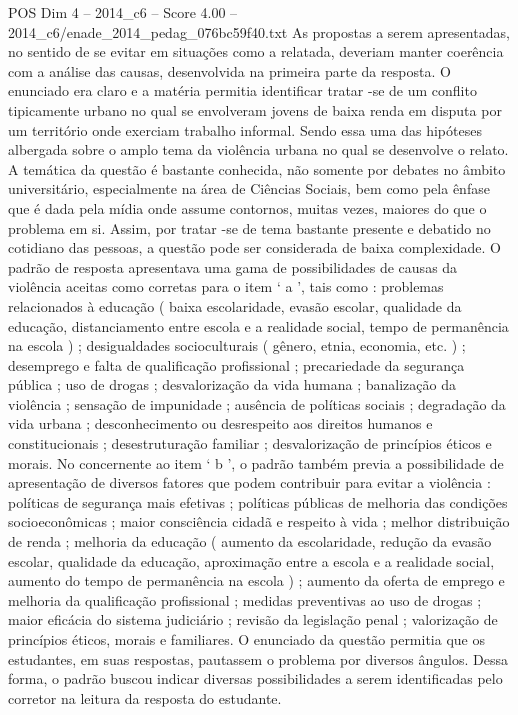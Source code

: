 \begin{textsample}{POS Dim 4 – 2014\_c6 – Score 4.00 – 2014\_c6/enade\_2014\_pedag\_076bc59f40.txt}
As propostas a serem apresentadas, no sentido de se evitar em situações como a relatada, deveriam manter coerência com a análise das causas, desenvolvida na primeira parte da resposta.
O enunciado era claro e a matéria permitia identificar tratar -se de um conflito tipicamente urbano no qual se envolveram jovens de baixa renda em disputa por um território onde exerciam trabalho informal.
Sendo essa uma das hipóteses albergada sobre o amplo tema da violência urbana no qual se desenvolve o relato.
A temática da questão é bastante conhecida, não somente por debates no âmbito universitário, especialmente na área de Ciências Sociais, bem como pela ênfase que é dada pela mídia onde assume contornos, muitas vezes, maiores do que o problema em si.
Assim, por tratar -se de tema bastante presente e debatido no cotidiano das pessoas, a questão pode ser considerada de baixa complexidade.
O padrão de resposta apresentava uma gama de possibilidades de causas da violência aceitas como corretas para o item ‘ a ’, tais como : problemas relacionados à educação ( baixa escolaridade, evasão escolar, qualidade da educação, distanciamento entre escola e a realidade social, tempo de permanência na escola ) ; desigualdades socioculturais ( gênero, etnia, economia, etc. ) ; desemprego e falta de qualificação profissional ; precariedade da segurança pública ; uso de drogas ; desvalorização da vida humana ; banalização da violência ; sensação de impunidade ; ausência de políticas sociais ; degradação da vida urbana ; desconhecimento ou desrespeito aos direitos humanos e constitucionais ; desestruturação familiar ; desvalorização de princípios éticos e morais.
No concernente ao item ‘ b ’, o padrão também previa a possibilidade de apresentação de diversos fatores que podem contribuir para evitar a violência : políticas de segurança mais efetivas ; políticas públicas de melhoria das condições socioeconômicas ; maior consciência cidadã e respeito à vida ; melhor distribuição de renda ; melhoria da educação ( aumento da escolaridade, redução da evasão escolar, qualidade da educação, aproximação entre a escola e a realidade social, aumento do tempo de permanência na escola ) ; aumento da oferta de emprego e melhoria da qualificação profissional ; medidas preventivas ao uso de drogas ; maior eficácia do sistema judiciário ; revisão da legislação penal ; valorização de princípios éticos, morais e familiares.
O enunciado da questão permitia que os estudantes, em suas respostas, pautassem o problema por diversos ângulos.
Dessa forma, o padrão buscou indicar diversas possibilidades a serem identificadas pelo corretor na leitura da resposta do estudante.

\end{textsample}

